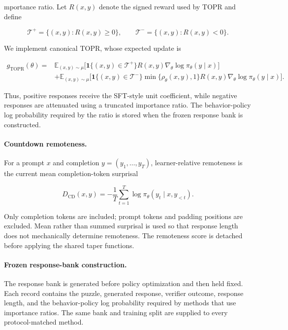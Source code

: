 mportance ratio. Let
\(R(x,y)\) denote the signed reward used by TOPR and define

\[
\mathcal{T}^{+}
=
\{(x,y):R(x,y)\geq 0\},
\qquad
\mathcal{T}^{-}
=
\{(x,y):R(x,y)<0\}.
\]

We implement canonical TOPR, whose expected update is

\[
\begin{aligned}
g_{\mathrm{TOPR}}(\theta)
={}&
\mathbb{E}_{(x,y)\sim\mu}
\Big[
\mathbf{1}\{(x,y)\in\mathcal{T}^{+}\}
R(x,y)
\nabla_\theta\log\pi_\theta(y\mid x)
\Big]
\\
&+
\mathbb{E}_{(x,y)\sim\mu}
\Big[
\mathbf{1}\{(x,y)\in\mathcal{T}^{-}\}
\min\{\rho_\theta(x,y),1\}
R(x,y)
\nabla_\theta\log\pi_\theta(y\mid x)
\Big].
\end{aligned}
\]

Thus, positive responses receive the SFT-style unit coefficient, while
negative responses are attenuated using a truncated importance ratio.
The behavior-policy log probability required by the ratio is stored
when the frozen response bank is constructed.

\paragraph{Countdown remoteness.}

For a prompt \(x\) and completion
\(y=(y_1,\ldots,y_T)\), learner-relative remoteness is the current mean
completion-token surprisal

\[
D_{\mathrm{CD}}(x,y)
=
-\frac{1}{T}
\sum_{t=1}^{T}
\log
\pi_\theta
\left(
y_t\mid x,y_{<t}
\right).
\]

Only completion tokens are included; prompt tokens and padding positions
are excluded. Mean rather than summed surprisal is used so that response
length does not mechanically determine remoteness. The remoteness score
is detached before applying the shared taper functions.

\paragraph{Frozen response-bank construction.}

The response bank is generated before policy optimization and then held
fixed. Each record contains the puzzle, generated response, verifier
outcome, response length, and the behavior-policy log probability
required by methods that use importance ratios. The same bank and
training split are supplied to every protocol-matched method.

